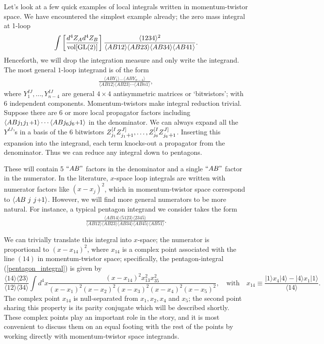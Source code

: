 \documentclass[11pt, reqno]{article}
\newcommand{\be}{\begin{eqnarray}}
\newcommand{\ee}{\end{eqnarray}}
\newcommand{\smallplus}{\hspace{0.5pt}\text{{\small+}}\hspace{-0.5pt}}
\newcommand{\ab}[1]{\langle #1\rangle}
\begin{document}
Let's look at a few quick examples of local integrals written in momentum-twistor space. We have encountered the simplest example
already; the zero mass integral at 1-loop \be \int \left[\frac{d^4 Z_A d^4
Z_B}{{\rm vol[GL(2)]}}\right] \frac{\langle 1 2 3 4 \rangle^2}{\langle AB 12
\rangle \langle AB 23 \rangle \langle AB 34 \rangle \langle AB 41
\rangle}. \ee Henceforth, we will drop the integration measure and only write the integrand.
The most general $1$-loop integrand is of the form
\be
\frac{\ab{ABY_1} \ldots \ab{ABY_{n-4}}}{\ab{AB12} \ab{AB23} \cdots \ab{ABn1}},
\ee
where $Y^{IJ}_1, \ldots, Y^{IJ}_{n-4}$ are general $4\times4$ antisymmetric matrices or `bitwistors'; with 6 independent components.
Momentum-twistors make integral reduction trivial. Suppose there are 6 or more local propagator factors including $\ab{ABj_1 j_1 \smallplus 1} \cdots \ab{ABj_6 j_6\smallplus1}$ in the denominator. We can always expand all the $Y^{IJ}$'s in a basis of the 6 bitwistors $Z^{[I}_{j_1} Z^{J]}_{j_1\smallplus1}, \ldots, Z^{[I}_{j_6} Z^{J]}_{j_6\smallplus1}$. Inserting this expansion into the integrand, each term knocks-out a propagator from the denominator. Thus we can reduce any integral down to pentagons.

These will contain 5 $``AB"$ factors in the denominator and a single
$``AB"$ factor in the numerator. In the literature, $x$-space
loop integrals are written with numerator factors like $(x -
x_j)^2$, which in momentum-twistor space correspond to $\langle AB \,\,j \,\, j\smallplus1 \rangle$. However, we will find more general numerators to be more natural. For instance, a typical pentagon integrand we consider takes the
form \be \frac{\langle AB 14 \rangle \ab{5123}\ab{2345}}{\langle AB 12 \rangle \langle AB 23
\rangle \langle AB 34 \rangle \ab{AB 45} \langle AB 51
\rangle}.\label{pentagon_integral}\ee

We can trivially translate this integral into
$x$-space; the numerator is proportional to $(x -
x_{14})^2$, where $x_{14}$ is a complex point associated with the
line $(14)$ in momentum-twistor space; specifically, the pentagon-integral (\ref{pentagon_integral}) is given by
\begin{equation} \frac{\langle 14\rangle\langle 23\rangle}{\langle 12\rangle\langle 34\rangle}\int\!\!d^4x \frac{(x-x_{14})^2x_{13}^2x_{35}^2}{(x-x_1)^2(x-x_2)^2(x-x_3)^2(x-x_4)^2(x-x_5)^2},
\quad\mathrm{with}\quad
x_{14}\equiv\frac{|1\rangle x_4|4\rangle-|4\rangle x_{1}|1\rangle}{\ab{14}}.
\end{equation}
The complex point $x_{14}$ is null-separated from $x_1,x_2,x_4$ and $x_5$; the second point sharing this property
is its parity conjugate which will be described shortly.
These complex points play an important role in the story, and it is most convenient to discuss them
on an equal footing with the rest of the points by working directly
with momentum-twistor space integrands.
\end{document}
